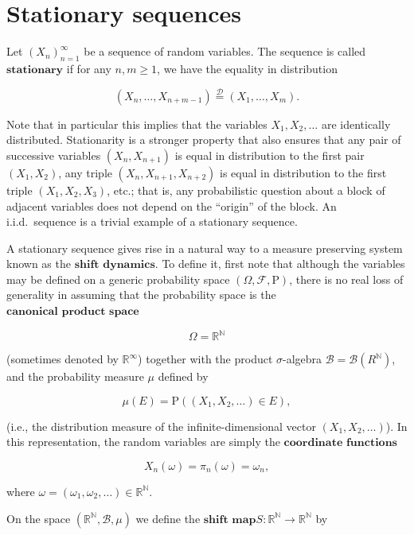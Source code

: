 \documentclass[11pt]{report}
\newcommand{\R}{\mathbb{R}}
\newcommand{\N}{\mathbb{N}}
\theoremstyle{plain}
\theoremstyle{definition}
\begin{document}
\section{Stationary sequences}
\label{sec-stationary}

Let $(X_n)_{n=1}^\infty$ be a sequence of random
variables. The sequence is called
$\textbf{stationary}$ if for any $n,m\ge 1$, we have
the equality in distribution

\begin{equation*} \tag{14}\label{eq:def-stationary}
(X_n,\ldots,X_{n+m-1}) \stackrel{\mathcal{D}}{=} (X_1,\ldots,X_m).
\end{equation*}

\noindent Note that in particular this implies that the
variables $X_1,X_2,\ldots$ are identically
distributed. Stationarity is a stronger property that
also ensures that any pair of successive variables
$(X_n,X_{n+1})$ is equal in distribution to the first
pair $(X_1,X_2)$, any triple $(X_n,X_{n+1},X_{n+2})$
is equal in distribution to the first triple
$(X_1,X_2,X_3)$, etc.; that is, any probabilistic
question about a block of adjacent variables does not
depend on the ``origin'' of the block. An i.i.d.\
sequence is a trivial example of a stationary
sequence.

A stationary sequence gives rise in a natural way to
a measure preserving system known as the
$\textbf{shift dynamics}$. To define it, first note
that although the variables may be defined on a
generic probability space
$(\Omega, \mathcal{F},\mathrm{P})$, there is no real
loss of generality in assuming that the probability
space is the $\textbf{canonical product space}$

\[
\Omega = \R^\N
\]

\noindent (sometimes denoted by $\R^\infty$) together with the
product $\sigma$-algebra
$\mathcal{B}=\mathcal{B}(R^\N)$, and the probability
measure $\mu$ defined by

\[
\mu(E) = \mathrm{P}( (X_1,X_2,\ldots) \in E ),
\]

\noindent (i.e., the distribution measure of the
infinite-dimensional vector $(X_1,X_2,\ldots)$). In
this representation, the random variables are simply
the $\textbf{coordinate functions}$

\[
X_n(\omega) = \pi_n(\omega) = \omega_n,
\]

\noindent where $\omega=(\omega_1, \omega_2, \ldots) \in \R^\N$.

On the space $(\R^\N,\mathcal{B}, \mu)$ we define the
$\textbf{shift map}$$S:\R^\N\to\R^\N$ by
\end{document}
